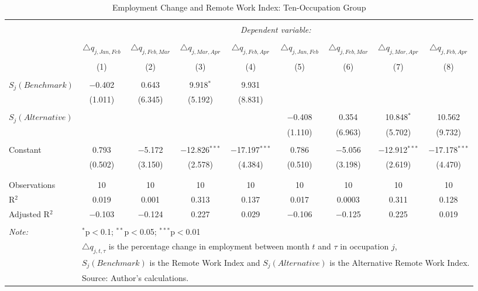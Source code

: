 
\begin{table}[!htbp] \centering 
  \caption{Employment Change and Remote Work Index: Ten-Occupation Group} 
  \label{tab:regression_dynamics_10oc} 
\footnotesize 
\begin{tabular}{@{\extracolsep{5pt}}lcccccccc} 
\\[-1.8ex]\hline 
\hline \\[-1.8ex] 
 & \multicolumn{8}{c}{\textit{Dependent variable:}} \\ 
\cline{2-9} 
\\[-1.8ex] & $\triangle q_{j,Jan,Feb}$ & $\triangle q_{j,Feb,Mar}$ & $\triangle q_{j,Mar,Apr}$ & $\triangle q_{j,Feb,Apr}$ & $\triangle q_{j,Jan,Feb}$ & $\triangle q_{j,Feb,Mar}$ & $\triangle q_{j,Mar,Apr}$ & $\triangle q_{j,Feb,Apr}$ \\ 
\\[-1.8ex] & (1) & (2) & (3) & (4) & (5) & (6) & (7) & (8)\\ 
\hline \\[-1.8ex] 
 $S_{j}(Benchmark)$ & $-$0.402 & 0.643 & 9.918$^{*}$ & 9.931 &  &  &  &  \\ 
  & (1.011) & (6.345) & (5.192) & (8.831) &  &  &  &  \\ 
  & & & & & & & & \\ 
 $S_{j}(Alternative)$ &  &  &  &  & $-$0.408 & 0.354 & 10.848$^{*}$ & 10.562 \\ 
  &  &  &  &  & (1.110) & (6.963) & (5.702) & (9.732) \\ 
  & & & & & & & & \\ 
 Constant & 0.793 & $-$5.172 & $-$12.826$^{***}$ & $-$17.197$^{***}$ & 0.786 & $-$5.056 & $-$12.912$^{***}$ & $-$17.178$^{***}$ \\ 
  & (0.502) & (3.150) & (2.578) & (4.384) & (0.510) & (3.198) & (2.619) & (4.470) \\ 
  & & & & & & & & \\ 
\hline \\[-1.8ex] 
Observations & 10 & 10 & 10 & 10 & 10 & 10 & 10 & 10 \\ 
R$^{2}$ & 0.019 & 0.001 & 0.313 & 0.137 & 0.017 & 0.0003 & 0.311 & 0.128 \\ 
Adjusted R$^{2}$ & $-$0.103 & $-$0.124 & 0.227 & 0.029 & $-$0.106 & $-$0.125 & 0.225 & 0.019 \\ 
\hline 
\hline \\[-1.8ex] 
\textit{Note:}  & \multicolumn{8}{l}{$^{*}$p$<$0.1; $^{**}$p$<$0.05; $^{***}$p$<$0.01} \\ 
 & \multicolumn{8}{l}{$\triangle q_{j,t,\tau}$ is the percentage change in employment between month $t$ and $\tau$ in occupation $j$,} \\ 
 & \multicolumn{8}{l}{$S_{j} (Benchmark)$ is the Remote Work Index and $S_{j} (Alternative)$ is the Alternative Remote Work Index.} \\ 
 & \multicolumn{8}{l}{Source: Author's calculations.} \\ 
\end{tabular} 
\end{table} 
